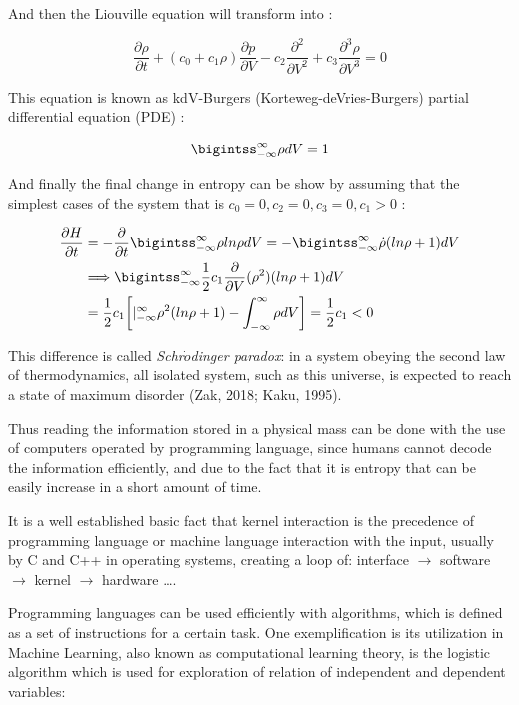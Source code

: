 \documentclass[12pt]{article}
\begin{document}
And then the Liouville equation will transform into :

\begin{equation*}
	\frac{\partial \rho}{\partial t} + (c_0 + c_1 \rho)\frac{\partial p}{\partial V} - c_2 \frac{\partial ^2}{\partial V^2} + c_3 \frac{\partial ^3 \rho}{\partial V^3} = 0
\end{equation*}

This equation is known as kdV-Burgers (Korteweg-deVries-Burgers) partial differential equation (PDE) :

\begin{equation*}
	\bigintss_{-\infty}^{\infty} \rho dV = 1 \nonumber
\end{equation*}

And finally the final change in entropy can be show by assuming that the simplest cases of the system that is $c_0 = 0, c_2 = 0, c_3 = 0, c_1 > 0$ :

\begin{align}
	\frac{\partial H}{\partial t} &= - \frac{\partial}{\partial t} \bigintss_{-\infty}^{\infty} \rho ln \rho dV = - \bigintss_{-\infty}^{\infty} \dot{\rho} (ln \rho + 1) dV \nonumber \\
	&\Longrightarrow \bigintss_{-\infty}^{\infty} \frac{1}{2} c_1 \frac{\partial}{\partial V} (\rho ^2) (ln \rho + 1)dV \nonumber \\
	&= \frac{1}{2} c_1 \bigg [  \rvert_{-\infty}^{\infty} \rho ^2 (ln \rho + 1) - \int_{-\infty}^{\infty} \rho dV \bigg ] = \frac{1}{2} c_1 < 0 
\end{align}

This difference is called \textit{Schr$\dot{o}$dinger paradox}: in a system obeying the second law of thermodynamics, all isolated system, such as this universe, is expected to reach a state of maximum disorder (Zak, 2018; Kaku, 1995).

Thus reading the information stored in a physical mass can be done with the use of computers operated by programming language, since humans cannot decode the information efficiently, and due to the fact that it is entropy that can be easily increase in a short amount of time. 

It is a well established basic fact that kernel interaction is the precedence of programming language or machine language interaction with the input, usually by C and C++ in operating systems, creating a loop of: interface $\longrightarrow$ software $\longrightarrow$ kernel $\longrightarrow$ hardware \dots.

Programming languages can be used efficiently with algorithms, which is defined as a set of instructions for a certain task. One exemplification is its utilization in Machine Learning, also known as computational learning theory, is the logistic algorithm which is used for exploration of relation of independent and dependent variables:
	
\end{document}
